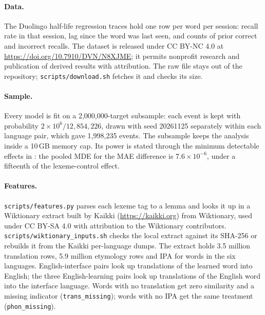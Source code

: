 \documentclass[11pt]{article}
\begin{document}
\paragraph{Data.} The Duolingo half-life regression traces
\autocite{settles2016data} hold one row per word per session: recall
rate in that session, lag since the word was last seen, and counts of
prior correct and incorrect recalls. The dataset is released under
CC BY-NC 4.0 at
\url{https://doi.org/10.7910/DVN/N8XJME}; it permits nonprofit research
and publication of derived results with attribution. The raw file stays
out of the repository; \texttt{scripts/download.sh} fetches it and checks
its size.

\paragraph{Sample.} Every model is fit on a 2,000,000-target subsample:
each event is kept with probability $2\times10^{6}/12{,}854{,}226$, drawn
with seed 20261125 separately within each language pair, which gave
1,998,235 events. The subsample keeps the analysis inside a 10\,GB memory
cap. Its power is stated through the minimum detectable effects in
: the pooled MDE for the MAE difference is
$7.6\times10^{-6}$, under a fifteenth of the lexeme-control effect.

\paragraph{Features.} \texttt{scripts/features.py} parses each lexeme tag
to a lemma and looks it up in a Wiktionary extract built by Kaikki
(\url{https://kaikki.org}) from Wiktionary, used under CC BY-SA 4.0 with
attribution to the Wiktionary contributors. \texttt{scripts/wiktionary\_inputs.sh}
checks the local extract against its SHA-256 or rebuilds it from the
Kaikki per-language dumps. The extract holds
3.5 million translation rows, 5.9 million etymology rows and IPA for
words in the six languages. English-interface pairs look up translations
of the learned word into English; the three English-learning pairs look
up translations of the English word into the interface language. Words
with no translation get zero similarity and a missing indicator
(\texttt{trans\_missing}); words with no IPA get the same treatment
(\texttt{phon\_missing}).
\end{document}
